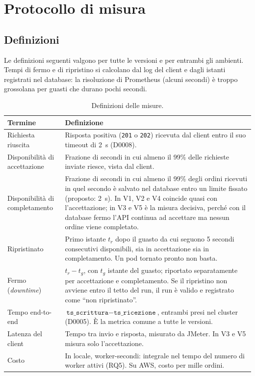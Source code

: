 \chapter{Protocollo di misura}
\label{cap:misura}

\section{Definizioni}
\label{sec:definizioni}

Le definizioni seguenti valgono per tutte le versioni e per entrambi gli ambienti. Tempi di fermo e di ripristino si calcolano dal log del client e dagli istanti registrati nel database: la risoluzione di Prometheus (alcuni secondi) è troppo grossolana per guasti che durano pochi secondi.

\begin{table}[htbp]
\centering
\caption{Definizioni delle misure.}
\label{tab:definizioni}
\begin{tabularx}{\linewidth}{@{}>{\raggedright\arraybackslash}p{3.6cm}L@{}}
\toprule
\textbf{Termine} & \textbf{Definizione} \\
\midrule
Richiesta riuscita & Risposta positiva (\texttt{201} o \texttt{202}) ricevuta dal client entro il suo timeout di 2~s (D0008). \\
Disponibilità di accettazione & Frazione di secondi in cui almeno il 99\% delle richieste inviate riesce, vista dal client. \\
Disponibilità di completamento & Frazione di secondi in cui almeno il 99\% degli ordini ricevuti in quel secondo è salvato nel database entro un limite fissato (proposto: 2~s). In V1, V2 e V4 coincide quasi con l'accettazione; in V3 e V5 è la misura decisiva, perché con il database fermo l'API continua ad accettare ma nessun ordine viene completato. \\
Ripristinato & Primo istante $t_r$ dopo il guasto da cui seguono 5 secondi consecutivi disponibili, sia in accettazione sia in completamento. Un pod tornato pronto non basta. \\
Fermo (\textit{downtime}) & $t_r - t_g$, con $t_g$ istante del guasto; riportato separatamente per accettazione e completamento. Se il ripristino non avviene entro il tetto del run, il run è valido e registrato come ``non ripristinato''. \\
Tempo end-to-end & $\texttt{ts\_scrittura} - \texttt{ts\_ricezione}$, entrambi presi nel cluster (D0005). È la metrica comune a tutte le versioni. \\
Latenza del client & Tempo tra invio e risposta, misurato da JMeter. In V3 e V5 misura solo l'accettazione. \\
Costo & In locale, worker-secondi: integrale nel tempo del numero di worker attivi (RQ5). Su AWS, costo per mille ordini. \\
\bottomrule
\end{tabularx}
\end{table}

